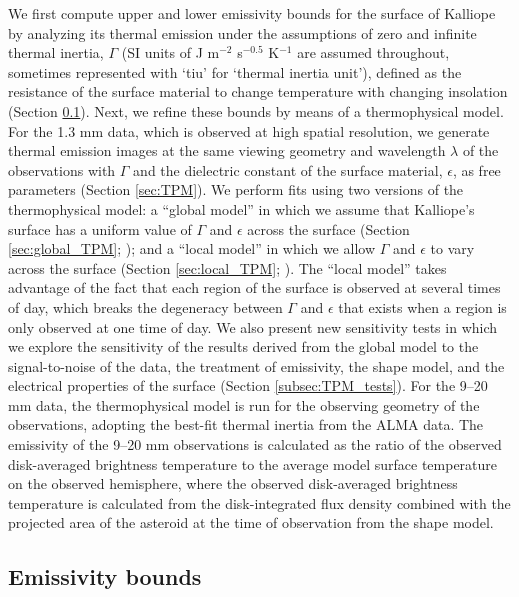 \documentclass[]{aastex631}
\begin{document}
We first compute upper and lower emissivity bounds for the surface of Kalliope by analyzing its thermal emission under the assumptions of zero and infinite thermal inertia, $\Gamma$ (SI units of J m$^{-2}$ s$^{-0.5}$ K$^{-1}$ are assumed throughout, sometimes represented with `tiu' for `thermal inertia unit'), defined as the resistance of the surface material to change temperature with changing insolation (Section \ref{sec:emissivity_bounds}). Next, we refine these bounds by means of a thermophysical model. For the 1.3 mm data, which is observed at high spatial resolution, we generate thermal emission images at the same viewing geometry and wavelength $\lambda$ of the observations with $\Gamma$ and the dielectric constant of the surface material, $\epsilon$, as free parameters (Section \ref{sec:TPM}). We perform fits using two versions of the thermophysical model: a ``global model'' in which we assume that Kalliope's surface has a uniform value of $\Gamma$ and $\epsilon$ across the surface (Section \ref{sec:global_TPM}; \cite{dekleer2021}); and a ``local model'' in which we allow $\Gamma$ and $\epsilon$ to vary across the surface (Section \ref{sec:local_TPM}; \cite{cambioni2022}). The ``local model'' takes advantage of the fact that each region of the surface is observed at several times of day, which breaks the degeneracy between $\Gamma$ and $\epsilon$ that exists when a region is only observed at one time of day. We also present new sensitivity tests in which we explore the sensitivity of the results derived from the global model to the signal-to-noise of the data, the treatment of emissivity, the shape model, and the electrical properties of the surface (Section \ref{subsec:TPM_tests}). For the 9--20 mm data, the thermophysical model is run for the observing geometry of the observations, adopting the best-fit thermal inertia from the ALMA data. The emissivity of the 9--20 mm observations is calculated as the ratio of the observed disk-averaged brightness temperature to the average model surface temperature on the observed hemisphere, where the observed disk-averaged brightness temperature is calculated from the disk-integrated flux density combined with the projected area of the asteroid at the time of observation from the shape model.

\subsection{Emissivity bounds}
\label{sec:emissivity_bounds}
\end{document}
